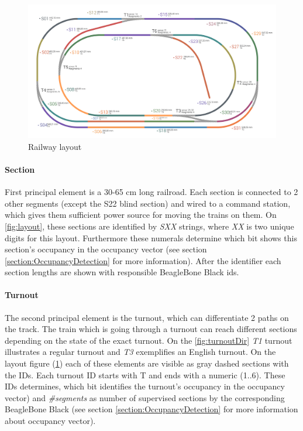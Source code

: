 \begin{figure}[ht]
	\centering
	\includegraphics[width=150mm, keepaspectratio]{figures/modes3/layoutBigsmall.png}
	\caption{Railway layout}
	\label{fig:layout}
\end{figure}

\paragraph{Section} 
First principal element is a 30-65 cm long railroad. Each section is connected to 2 other segments (except the S22 blind section) and wired to a command station, which gives them sufficient power source for moving the trains on them. On \autoref{fig:layout}, these sections are identified by \textit{SXX} strings, where \textit{XX} is two unique digits for this layout. Furthermore these numerals determine which bit shows this section's occupancy in the occupancy vector (see section \ref{section:OccupancyDetection} for more information). After the identifier each section lengths are shown with responsible BeagleBone Black ids.

\paragraph{Turnout}
The second principal element is the turnout, which can differentiate 2 paths on the track. The train which is going through a turnout can reach different sections depending on the state of the exact turnout. On the \autoref{fig:turnoutDir} \textit{T1} turnout illustrates a regular turnout and \textit{T3} exemplifies an English turnout. On the layout figure (\ref{fig:layout}) each of these elements are visible as gray dashed sections with the IDs. Each turnout ID starts with T and ends with a numeric (1..6). These IDs determines, which bit identifies the turnout's occupancy in the occupancy vector) and \textit{\#segments} as number of supervised sections by the corresponding BeagleBone Black (see section \ref{section:OccupancyDetection} for more information about occupancy vector). 

